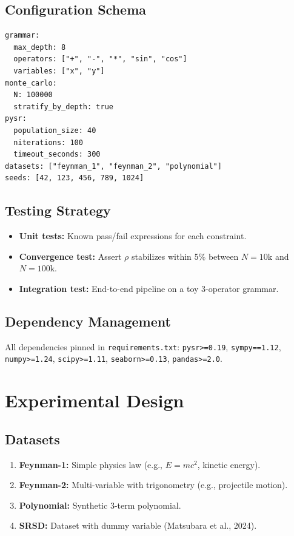 \documentclass[11pt,a4paper]{article}
\begin{document}
\subsection{Configuration Schema}
\begin{lstlisting}[caption={Minimal \texttt{config.yaml} schema.}]
grammar:
  max_depth: 8
  operators: ["+", "-", "*", "sin", "cos"]
  variables: ["x", "y"]
monte_carlo:
  N: 100000
  stratify_by_depth: true
pysr:
  population_size: 40
  niterations: 100
  timeout_seconds: 300
datasets: ["feynman_1", "feynman_2", "polynomial"]
seeds: [42, 123, 456, 789, 1024]
\end{lstlisting}

\subsection{Testing Strategy}
\begin{itemize}
  \item \textbf{Unit tests:} Known pass/fail expressions for each constraint.
  \item \textbf{Convergence test:} Assert $\rho$ stabilizes within 5\% between $N=10\text{k}$ and $N=100\text{k}$.
  \item \textbf{Integration test:} End-to-end pipeline on a toy 3-operator grammar.
\end{itemize}

\subsection{Dependency Management}
All dependencies pinned in \texttt{requirements.txt}:
\texttt{pysr>=0.19}, \texttt{sympy==1.12}, \texttt{numpy>=1.24}, \texttt{scipy>=1.11}, \texttt{seaborn>=0.13}, \texttt{pandas>=2.0}.

\section{Experimental Design}
\label{sec:experiments}

\subsection{Datasets}
\begin{enumerate}[label=\textbf{D\arabic*}]
  \item \textbf{Feynman-1:} Simple physics law (e.g., $E = mc^2$, kinetic energy).
  \item \textbf{Feynman-2:} Multi-variable with trigonometry (e.g., projectile motion).
  \item \textbf{Polynomial:} Synthetic 3-term polynomial.
  \item \textbf{SRSD:} Dataset with dummy variable (Matsubara et al., 2024).
\end{enumerate}
\end{document}
